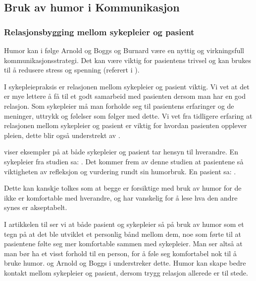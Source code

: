 \subsection{Bruk av humor i Kommunikasjon}

\subsubsection{Relasjonsbygging mellom sykepleier og pasient}
\label{disk.relbygg}

Humor kan i følge Arnold og Boggs og Burnard være en nyttig og virkningsfull
kommunikasjonsstrategi. Det kan være viktig for pasientens trivsel og kan
brukes til å redusere stress og spenning (referert i ).

I sykepleiepraksis er relasjonen mellom sykepleier og pasient viktig. Vi vet at
det er mye lettere å få til et godt samarbeid med pasienten dersom man har en
god relasjon. Som sykepleier må man forholde seg til pasientens erfaringer og
de meninger, uttrykk og følelser som følger med dette. Vi vet fra tidligere
erfaring at relasjonen mellom sykepleier og pasient er viktig for hvordan
pasienten opplever pleien, dette blir også understrekt av .

 viser eksempler på at både sykepleier og pasient tar hensyn
til hverandre. En sykepleier fra studien sa:
. Det kommer frem av denne studien at pasientene så viktigheten av
refleksjon og vurdering rundt sin humorbruk. En pasient sa:
.

Dette kan kanskje tolkes som at begge er forsiktige med bruk av humor for de
ikke er komfortable med hverandre, og har vanskelig for å lese hva den andre
synes er akseptabelt.

I artikkelen til  ser vi at både pasient og sykepleier så på
bruk av humor som et tegn på at det ble utviklet et personlig bånd mellom dem,
noe som førte til at pasientene følte seg mer komfortable sammen med
sykepleier. Man ser altså at man bør ha et visst forhold til en person, for å
føle seg komfortabel nok til å bruke humor.  og Arnold
og Boggs i  understreker dette. Humor kan skape bedre kontakt
mellom sykepleier og pasient, dersom trygg relasjon allerede er til stede.

